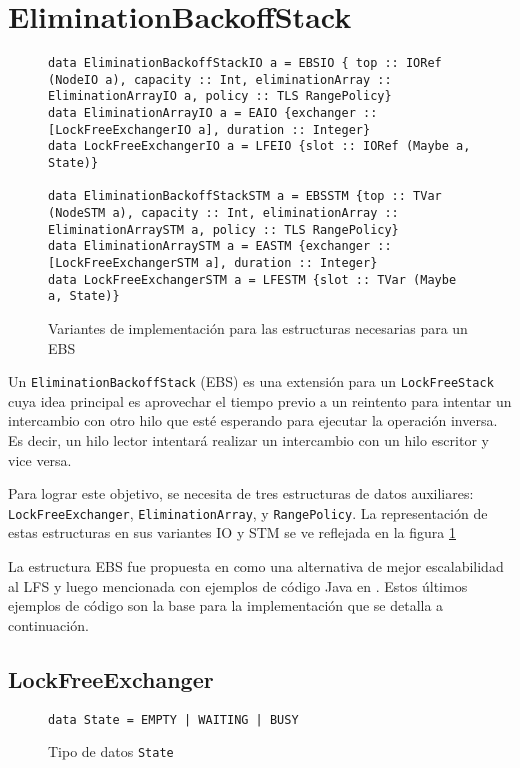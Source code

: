 \section{EliminationBackoffStack}\label{sec:ebs}
\begin{figure}[t]
  \begin{verbatim}
data EliminationBackoffStackIO a = EBSIO { top :: IORef (NodeIO a), capacity :: Int, eliminationArray :: EliminationArrayIO a, policy :: TLS RangePolicy}
data EliminationArrayIO a = EAIO {exchanger :: [LockFreeExchangerIO a], duration :: Integer}
data LockFreeExchangerIO a = LFEIO {slot :: IORef (Maybe a, State)}

data EliminationBackoffStackSTM a = EBSSTM {top :: TVar (NodeSTM a), capacity :: Int, eliminationArray :: EliminationArraySTM a, policy :: TLS RangePolicy}
data EliminationArraySTM a = EASTM {exchanger :: [LockFreeExchangerSTM a], duration :: Integer}
data LockFreeExchangerSTM a = LFESTM {slot :: TVar (Maybe a, State)}
\end{verbatim}
\caption{Variantes de implementación para las estructuras necesarias para un EBS}
\label{fig:ebs-reps}
\end{figure}

Un \texttt{EliminationBackoffStack} (EBS) es una extensión para un \texttt{LockFreeStack} cuya idea principal es aprovechar el tiempo previo a un reintento para intentar un intercambio con otro hilo que esté esperando para ejecutar la operación inversa. Es decir, un hilo lector intentará realizar un intercambio con un hilo escritor y vice versa.

Para lograr este objetivo, se necesita de tres estructuras de datos auxiliares: \texttt{LockFreeExchanger}, \texttt{EliminationArray}, y \texttt{RangePolicy}. La representación de estas estructuras en sus variantes IO y STM se ve reflejada en la figura \ref{fig:ebs-reps}

La estructura EBS fue propuesta en \cite{ebs} como una alternativa de mejor escalabilidad al LFS y luego mencionada con ejemplos de código Java en \cite{shavit}. Estos últimos ejemplos de código son la base para la implementación que se detalla a continuación.

\subsection{LockFreeExchanger}\label{sub-lfe}
\begin{figure}[t]
  \centering
\begin{verbatim}
data State = EMPTY | WAITING | BUSY
\end{verbatim}
  \caption{Tipo de datos \texttt{State}}
  \label{fig:state}
\end{figure}

